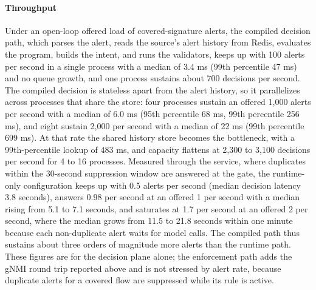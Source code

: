\documentclass[final,5p]{elsarticle}
\begin{document}
\paragraph{Throughput}
Under an open-loop offered load of covered-signature alerts, the compiled decision path, which parses the alert, reads the source's alert history from Redis, evaluates the program, builds the intent, and runs the validators, keeps up with 100 alerts per second in a single process with a median of 3.4 ms (99th percentile 47 ms) and no queue growth, and one process sustains about 700 decisions per second. The compiled decision is stateless apart from the alert history, so it parallelizes across processes that share the store: four processes sustain an offered 1,000 alerts per second with a median of 6.0 ms (95th percentile 68 ms, 99th percentile 256 ms), and eight sustain 2,000 per second with a median of 22 ms (99th percentile 699 ms). At that rate the shared history store becomes the bottleneck, with a 99th-percentile lookup of 483 ms, and capacity flattens at 2,300 to 3,100 decisions per second for 4 to 16 processes. Measured through the service, where duplicates within the 30-second suppression window are answered at the gate, the runtime-only configuration keeps up with 0.5 alerts per second (median decision latency 3.8 seconds), answers 0.98 per second at an offered 1 per second with a median rising from 5.1 to 7.1 seconds, and saturates at 1.7 per second at an offered 2 per second, where the median grows from 11.5 to 21.8 seconds within one minute because each non-duplicate alert waits for model calls. The compiled path thus sustains about three orders of magnitude more alerts than the runtime path. These figures are for the decision plane alone; the enforcement path adds the gNMI round trip reported above and is not stressed by alert rate, because duplicate alerts for a covered flow are suppressed while its rule is active.
\end{document}
